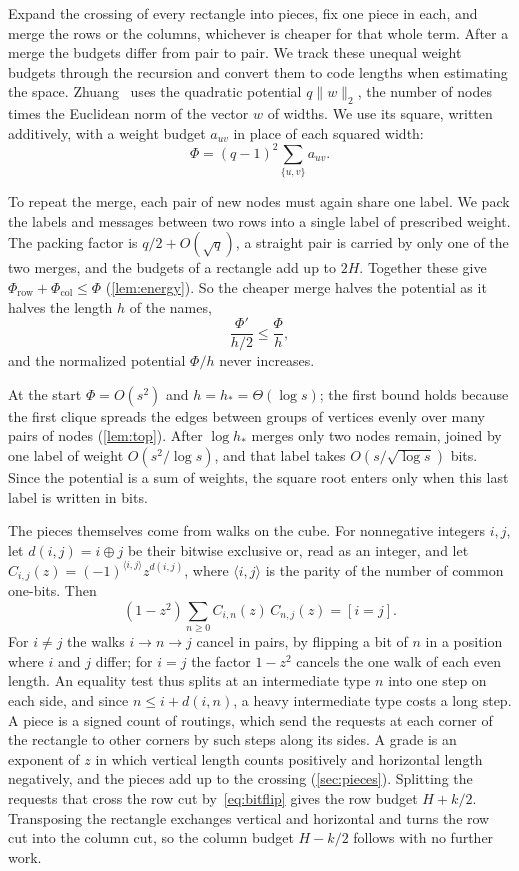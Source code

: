 \documentclass[11pt]{article}
\theoremstyle{definition}
\theoremstyle{definition}
\theoremstyle{remark}
\newcommand{\row}{\mathrm{row}}
\newcommand{\col}{\mathrm{col}}
\newcommand{\norm}[1]{\lVert #1\rVert}
\newcommand{\ip}[2]{\langle #1,#2\rangle}
\begin{document}
Expand the crossing of every rectangle into pieces, fix one piece in each, and merge the rows or the columns, whichever is cheaper for that whole term. After a merge the budgets differ from pair to pair. We track these unequal weight budgets through the recursion and convert them to code lengths when estimating the space. Zhuang~\cite{Zhu26} uses the quadratic potential $q\norm w_2$, the number of nodes times the Euclidean norm of the vector $w$ of widths. We use its square, written additively, with a weight budget $a_{uv}$ in place of each squared width:
\[
\Phi=(q-1)^2\sum_{\{u,v\}}a_{uv}.
\]

To repeat the merge, each pair of new nodes must again share one label. We pack the labels and messages between two rows into a single label of prescribed weight. The packing factor is $q/2+O(\sqrt q)$, a straight pair is carried by only one of the two merges, and the budgets of a rectangle add up to $2H$. Together these give $\Phi_\row+\Phi_\col\le\Phi$ (\cref{lem:energy}). So the cheaper merge halves the potential as it halves the length $h$ of the names,
\[
\frac{\Phi'}{h/2}\le\frac\Phi h,
\]
and the normalized potential $\Phi/h$ never increases.

At the start $\Phi=O(s^2)$ and $h=h_*=\Theta(\log s)$; the first bound holds because the first clique spreads the edges between groups of vertices evenly over many pairs of nodes (\cref{lem:top}). After $\log h_*$ merges only two nodes remain, joined by one label of weight $O(s^2/\log s)$, and that label takes $O(s/\sqrt{\log s})$ bits. Since the potential is a sum of weights, the square root enters only when this last label is written in bits.

The pieces themselves come from walks on the cube. For nonnegative integers $i,j$, let $d(i,j)=i\oplus j$ be their bitwise exclusive or, read as an integer, and let $C_{i,j}(z)=(-1)^{\ip ij}z^{d(i,j)}$, where $\ip ij$ is the parity of the number of common one-bits. Then
\begin{equation}\label{eq:bitflip}
(1-z^2)\sum_{n\ge0}C_{i,n}(z)\,C_{n,j}(z)=[i=j].
\end{equation}
For $i\ne j$ the walks $i\to n\to j$ cancel in pairs, by flipping a bit of $n$ in a position where $i$ and $j$ differ; for $i=j$ the factor $1-z^2$ cancels the one walk of each even length. An equality test thus splits at an intermediate type $n$ into one step on each side, and since $n\le i+d(i,n)$, a heavy intermediate type costs a long step. A piece is a signed count of routings, which send the requests at each corner of the rectangle to other corners by such steps along its sides. A grade is an exponent of $z$ in which vertical length counts positively and horizontal length negatively, and the pieces add up to the crossing (\cref{sec:pieces}). Splitting the requests that cross the row cut by~\eqref{eq:bitflip} gives the row budget $H+k/2$. Transposing the rectangle exchanges vertical and horizontal and turns the row cut into the column cut, so the column budget $H-k/2$ follows with no further work.
\end{document}
